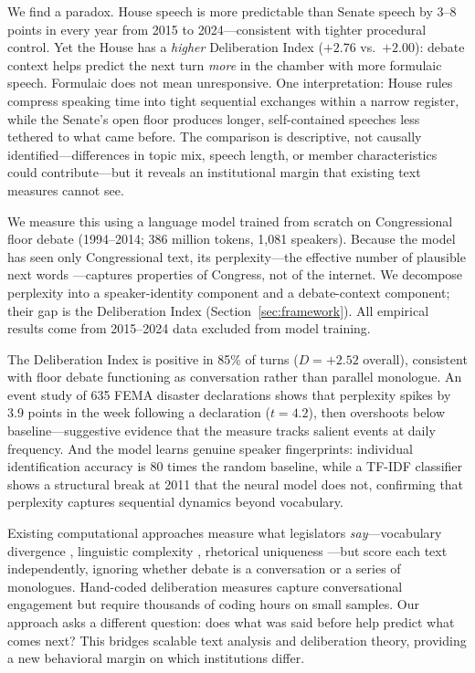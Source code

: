 \documentclass[12pt]{article}
\newcommand{\DI}{\mathit{D}}
\begin{document}
We find a paradox. House speech is more predictable than Senate speech by 3--8 points in every year from 2015 to 2024---consistent with tighter procedural control. Yet the House has a \textit{higher} Deliberation Index ($+2.76$ vs.\ $+2.00$): debate context helps predict the next turn \textit{more} in the chamber with more formulaic speech. Formulaic does not mean unresponsive. One interpretation: House rules compress speaking time into tight sequential exchanges within a narrow register, while the Senate's open floor produces longer, self-contained speeches less tethered to what came before. The comparison is descriptive, not causally identified---differences in topic mix, speech length, or member characteristics could contribute---but it reveals an institutional margin that existing text measures cannot see.

We measure this using a language model trained from scratch on Congressional floor debate (1994--2014; 386 million tokens, 1,081 speakers). Because the model has seen only Congressional text, its perplexity---the effective number of plausible next words \citep{shannon1948}---captures properties of Congress, not of the internet. We decompose perplexity into a speaker-identity component and a debate-context component; their gap is the Deliberation Index (Section~\ref{sec:framework}). All empirical results come from 2015--2024 data excluded from model training.

The Deliberation Index is positive in 85\% of turns ($\DI = +2.52$ overall), consistent with floor debate functioning as conversation rather than parallel monologue. An event study of 635 FEMA disaster declarations shows that perplexity spikes by 3.9 points in the week following a declaration ($t = 4.2$), then overshoots below baseline---suggestive evidence that the measure tracks salient events at daily frequency. And the model learns genuine speaker fingerprints: individual identification accuracy is 80 times the random baseline, while a TF-IDF classifier shows a structural break at 2011 that the neural model does not, confirming that perplexity captures sequential dynamics beyond vocabulary.

Existing computational approaches measure what legislators \textit{say}---vocabulary divergence \citep{gentzkow2019}, linguistic complexity \citep{spirling2016}, rhetorical uniqueness \citep{zhou2024}---but score each text independently, ignoring whether debate is a conversation or a series of monologues. Hand-coded deliberation measures \citep{steiner2004, bachtiger2019} capture conversational engagement but require thousands of coding hours on small samples. Our approach asks a different question: does what was said before help predict what comes next? This bridges scalable text analysis and deliberation theory, providing a new behavioral margin on which institutions differ.
\end{document}
